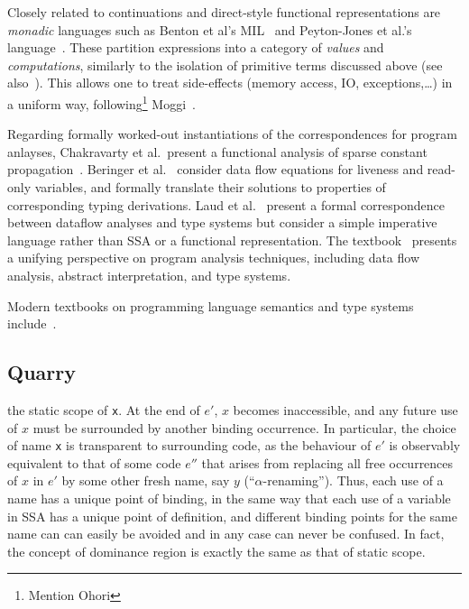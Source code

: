 Closely related to continuations and direct-style functional
representations are
\emph{monadic} languages such as Benton et al's MIL~\cite{BentonKennedyRussel:ICFP1998} and  Peyton-Jones et al.'s language~\cite{PeytonJonesShieldsLT:POPL1998}. These partition expressions into a category of \emph{values} and \emph{computations}, similarly to the isolation of primitive terms discussed above (see also~\cite{Reynolds1974,Plotkin75}). This allows one to treat side-effects (memory access, IO, exceptions,\ldots) in a uniform way, following\footnote{Mention Ohori} Moggi~\cite{Moggi1991}. 

Regarding formally worked-out instantiations of the correspondences
for program anlayses, Chakravarty et al.~present a functional analysis
of sparse constant propagation~\cite{ChakravartyKZ:COCV03}. Beringer
et al.~\cite{DBLP:journals/entcs/BeringerMS03} consider data flow
equations for liveness and read-only variables, and formally translate
their solutions to properties of corresponding typing
derivations. Laud et al.~\cite{DBLP:journals/tcs/LaudUV06} present a
formal correspondence between dataflow analyses and type systems but
consider a simple imperative language rather than SSA or a functional
representation. The textbook~\cite{NielsonNielsonHanking:POPA}
presents a unifying perspective on program analysis techniques,
including data flow analysis, abstract interpretation, and type
systems.

Modern textbooks on programming language semantics and type systems
include~\cite{winskel_93_formal,GunterBook,PierceTAPL}.



\subsection{Quarry}

the static scope of \verb|x|.  At the end
of $e'$, $x$ becomes inaccessible, and any future use of $x$ must be
surrounded by another binding occurrence. In particular, the choice of
name \verb|x| is transparent to surrounding code, as the behaviour of
$e'$ is observably equivalent to that of some code $e''$ that arises
from replacing all free occurrences of $x$ in $e'$ by some other fresh
name, say $y$ (``$\alpha$-renaming'').  Thus, each use of a
name has a unique point of binding, in the same way that each use
of a variable in SSA has a unique point of definition, and different
binding points for the same name can can easily be avoided
and in any case can never be confused. In fact, the concept of
dominance region is exactly the same as that of static scope.

